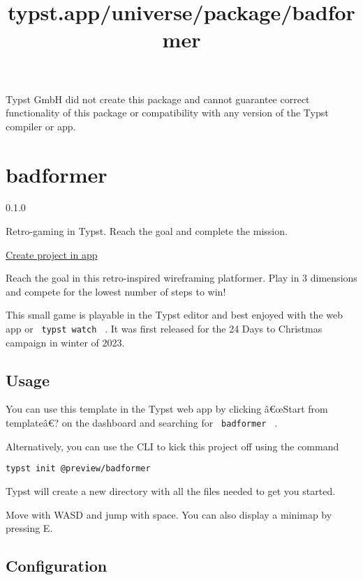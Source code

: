 Typst GmbH did not create this package and cannot guarantee correct
functionality of this package or compatibility with any version of the
Typst compiler or app.


\title{typst.app/universe/package/badformer}

\label{banner}
\label{template-thumbnail}

\section{badformer}\label{badformer}

{ 0.1.0 }

Retro-gaming in Typst. Reach the goal and complete the mission.

\href{/app?template=badformer&version=0.1.0}{Create project in app}

\label{readme}
Reach the goal in this retro-inspired wireframing platformer. Play in 3
dimensions and compete for the lowest number of steps to win!

This small game is playable in the Typst editor and best enjoyed with
the web app or \texttt{\ typst\ watch\ } . It was first released for the
24 Days to Christmas campaign in winter of 2023.

\subsection{Usage}\label{usage}

You can use this template in the Typst web app by clicking â€œStart from
templateâ€? on the dashboard and searching for \texttt{\ badformer\ } .

Alternatively, you can use the CLI to kick this project off using the
command

\begin{verbatim}
typst init @preview/badformer
\end{verbatim}

Typst will create a new directory with all the files needed to get you
started.

Move with WASD and jump with space. You can also display a minimap by
pressing E.

\subsection{Configuration}\label{configuration}

